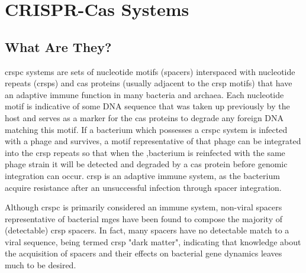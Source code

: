 \section*{CRISPR-Cas Systems}
\subsection*{What Are They?}
\ac{crspc} systems are sets of nucleotide motifs (spacers) interspaced with nucleotide repeats (\ac{crsp}s) and \ac{cas} proteins (usually adjacent to the \ac{crsp} motifs) that have an adaptive immune function in many bacteria and archaea\citep{crispgen}.
Each nucleotide motif is indicative of some DNA sequence that was taken up previously by the host and serves as a marker for the \ac{cas} proteins to degrade any foreign DNA matching this motif\citep{crispgen}.
If a bacterium which possesses a \ac{crspc} system is infected with a phage and survives, a motif representative of that phage can be integrated into the \ac{crsp} repeats so that when the ,bacterium is reinfected with the same phage strain it will be detected and degraded by a \ac{cas} protein before genomic integration can occur.
\ac{crsp} is an adaptive immune system, as the bacterium acquire resistance after an unsuccessful infection through spacer integration.\par
Although \ac{crspc} is primarily considered an immune system, non-viral spacers representative of bacterial \ac{mge}s have been found to compose the majority of (detectable) \ac{crsp} spacers\citep{nonvspacer}.
In fact, many spacers have no detectable match to a viral sequence, being termed \ac{crsp} "dark matter", indicating that knowledge about the acquisition of spacers and their effects on bacterial gene dynamics leaves much to be desired\citep{nonvspacer}.
